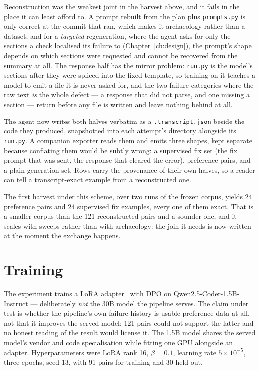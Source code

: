 Reconstruction was the weakest joint in the harvest above, and it fails in the
place it can least afford to. A prompt rebuilt from the plan plus
\texttt{prompts.py} is only correct at the commit that ran, which makes it
archaeology rather than a dataset; and for a \emph{targeted} regeneration, where
the agent asks for only the sections a check localised its failure to
(Chapter~\ref{ch:design}), the prompt's shape depends on which sections were
requested and cannot be recovered from the summary at all. The response half has
the mirror problem: \texttt{run.py} is the model's sections after they were
spliced into the fixed template, so training on it teaches a model to emit a file
it is never asked for, and the two failure categories where the raw text
\emph{is} the whole defect --- a response that did not parse, and one missing a
section --- return before any file is written and leave nothing behind at all.

The agent now writes both halves verbatim as a \texttt{.transcript.json} beside
the code they produced, snapshotted into each attempt's directory alongside its
\texttt{run.py}. A companion exporter reads them and emits three shapes, kept
separate because conflating them would be subtly wrong: a supervised fix set
(the fix prompt that was sent, the response that cleared the error), preference
pairs, and a plain generation set. Rows carry the provenance of their own
halves, so a reader can tell a transcript-exact example from a reconstructed one.

The first harvest under this scheme, over two runs of the frozen corpus, yields
24 preference pairs and 24 supervised fix examples, every one of them exact. That
is a smaller corpus than the 121 reconstructed pairs and a sounder one, and it
scales with sweeps rather than with archaeology: the join it needs is now written
at the moment the exchange happens.

\section{Training}
\label{sec:po-training}

The experiment trains a LoRA adapter~\cite{hu2021lora} with DPO on
Qwen2.5-Coder-1.5B-Instruct --- deliberately \emph{not} the 30B model the
pipeline serves. The claim under test is whether the pipeline's own failure
history is usable preference data at all, not that it improves the served model;
121 pairs could not support the latter and no honest reading of the result would
license it. The 1.5B model shares the served model's vendor and code
specialisation while fitting one GPU alongside an adapter. Hyperparameters were
LoRA rank 16, $\beta = 0.1$, learning rate $5\times10^{-5}$, three epochs, seed
13, with 91 pairs for training and 30 held out.

